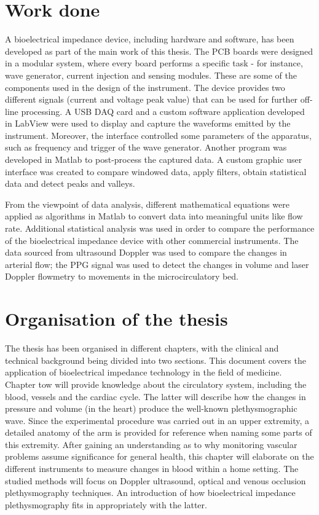 \section{Work done}
A bioelectrical impedance device, including hardware and software, has been developed as part of the main work of this thesis. The PCB boards were designed in a modular system, where every board performs a specific task - for instance, wave generator, current injection and sensing modules. These are some of the components used in the design of the instrument. The device provides two different signals (current and voltage peak value) that can be used for further off-line processing. A USB DAQ card and a custom software application developed in LabView \cite{LabView:2016} were used to display and capture the waveforms emitted by the instrument. Moreover, the interface controlled some parameters of the apparatus, such as frequency and trigger of the wave generator. Another program was developed in Matlab \cite{MATLAB:2016} to post-process the captured data. A custom graphic user interface was created to compare windowed data, apply filters, obtain statistical data and detect peaks and valleys.

From the viewpoint of data analysis, different mathematical equations were applied as algorithms in Matlab to convert data into meaningful units like flow rate. Additional statistical analysis was used in order to compare the performance of the bioelectrical impedance device with other commercial instruments. The data sourced from ultrasound Doppler was used to compare the changes in arterial flow; the PPG signal was used to detect the changes in volume and laser Doppler flowmetry to movements in the microcirculatory bed.


\section{Organisation of the thesis}
The thesis has been organised in different chapters, with the clinical and technical background being divided into two sections. This document covers the application of bioelectrical impedance technology in the field of medicine. Chapter tow will provide knowledge about the circulatory system, including the blood, vessels and the cardiac cycle. The latter will describe how the changes in pressure and volume (in the heart) produce the well-known plethysmographic wave. Since the experimental procedure was carried out in an upper extremity, a detailed anatomy of the arm is provided for reference when naming some parts of this extremity. After gaining an understanding as to why monitoring vascular problems assume significance for general health, this chapter will elaborate on the different instruments to measure changes in blood within a home setting. The studied methods will focus on Doppler ultrasound, optical and venous occlusion plethysmography techniques. An introduction of how bioelectrical impedance plethysmography fits in appropriately with the latter.

